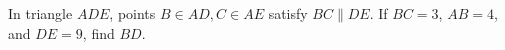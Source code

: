 In triangle $ ADE $, points $ B\in AD,C\in AE $ satisfy $ BC\parallel DE $. If $ BC=3 $, $ AB=4 $, and $ DE=9 $, find $ BD $.
